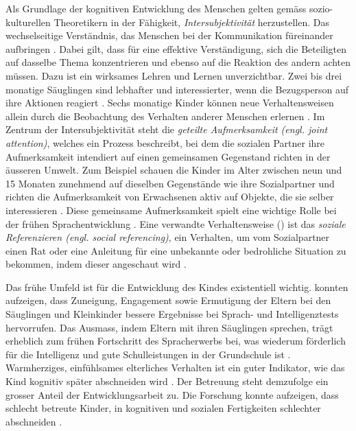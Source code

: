Als Grundlage der kognitiven Entwicklung des Menschen gelten gemäss sozio-kulturellen Theoretikern in der Fähigkeit, \textit{Intersubjektivität} herzustellen. Das wechselseitige Verständnis, das Menschen bei der Kommunikation füreinander aufbringen \cite{Gauvain2001, Rogoff1990}. Dabei gilt, dass für eine effektive Verständigung, sich die Beteiligten auf dasselbe Thema konzentrieren und ebenso auf die Reaktion des andern achten müssen. Dazu ist ein wirksames Lehren und Lernen unverzichtbar. Zwei bis drei monatige Säuglingen sind lebhafter und interessierter, wenn die Bezugsperson auf ihre Aktionen reagiert \cite{Murray1985}. Sechs monatige Kinder können neue Verhaltensweisen allein durch die Beobachtung des Verhalten anderer Menschen erlernen \cite{Collie1999}. Im Zentrum der Intersubjektivität steht die \textit{geteilte Aufmerksamkeit (engl. joint attention)}, welches ein Prozess beschreibt, bei dem die sozialen Partner ihre Aufmerksamkeit intendiert auf einen gemeinsamen Gegenstand richten in der äusseren Umwelt. Zum Beispiel schauen die Kinder im Alter zwischen neun und 15 Monaten zunehmend auf dieselben Gegenstände wie ihre Sozialpartner und richten die Aufmerksamkeit von Erwachsenen aktiv auf Objekte, die sie selber interessieren \cite{Adamson1991, Gauvain2001}. Diese gemeinsame Aufmerksamkeit spielt eine wichtige Rolle bei der frühen Sprachentwicklung \cite[S.~232]{Berk2011}. Eine verwandte Verhaltensweise () ist das \textit{soziale Referenzieren (engl. social referencing)}, ein Verhalten, um vom Sozialpartner einen Rat oder eine Anleitung für eine unbekannte oder bedrohliche Situation zu bekommen, indem dieser angeschaut wird \cite{Campos1981}. 

Das frühe Umfeld ist für die Entwicklung des Kindes existentiell wichtig.  konnten aufzeigen, dass Zuneigung, Engagement sowie Ermutigung der Eltern bei den Säuglingen und Kleinkinder bessere Ergebnisse bei Sprach- und Intelligenztests hervorrufen. Das Ausmass, indem Eltern mit ihren Säuglingen sprechen, trägt erheblich zum frühen Fortschritt des Spracherwerbs bei, was wiederum förderlich für die Intelligenz und gute Schulleistungen in der Grundschule ist \cite{Hart1995}. Warmherziges, einfühlsames elterliches Verhalten ist ein guter Indikator, wie das Kind kognitiv später abschneiden wird \cite[S.~225]{Berk2011}. Der Betreuung steht demzufolge ein grosser Anteil der Entwicklungsarbeit zu. Die Forschung konnte aufzeigen, dass schlecht betreute Kinder, in kognitiven und sozialen Fertigkeiten schlechter abschneiden \cite{NICHD2006}.

